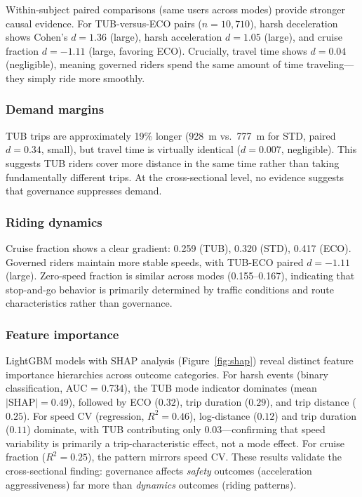 Within-subject paired comparisons (same users across modes) provide stronger causal evidence. For TUB-versus-ECO pairs ($n = 10{,}710$), harsh deceleration shows Cohen's $d = 1.36$ (large), harsh acceleration $d = 1.05$ (large), and cruise fraction $d = -1.11$ (large, favoring ECO). Crucially, travel time shows $d = 0.04$ (negligible), meaning governed riders spend the same amount of time traveling---they simply ride more smoothly.

\subsubsection{Demand margins}

TUB trips are approximately 19\% longer (928~m vs.~777~m for STD, paired $d = 0.34$, small), but travel time is virtually identical ($d = 0.007$, negligible). This suggests TUB riders cover more distance in the same time rather than taking fundamentally different trips. At the cross-sectional level, no evidence suggests that governance suppresses demand.

\subsubsection{Riding dynamics}

Cruise fraction shows a clear gradient: 0.259 (TUB), 0.320 (STD), 0.417 (ECO). Governed riders maintain more stable speeds, with TUB-ECO paired $d = -1.11$ (large). Zero-speed fraction is similar across modes (0.155--0.167), indicating that stop-and-go behavior is primarily determined by traffic conditions and route characteristics rather than governance.

\subsubsection{Feature importance}

LightGBM models with SHAP analysis (Figure~\ref{fig:shap}) reveal distinct feature importance hierarchies across outcome categories. For harsh events (binary classification, AUC = 0.734), the TUB mode indicator dominates (mean $|\text{SHAP}| = 0.49$), followed by ECO ($0.32$), trip duration ($0.29$), and trip distance ($0.25$). For speed CV (regression, $R^2 = 0.46$), log-distance ($0.12$) and trip duration ($0.11$) dominate, with TUB contributing only $0.03$---confirming that speed variability is primarily a trip-characteristic effect, not a mode effect. For cruise fraction ($R^2 = 0.25$), the pattern mirrors speed CV. These results validate the cross-sectional finding: governance affects \textit{safety} outcomes (acceleration aggressiveness) far more than \textit{dynamics} outcomes (riding patterns).

